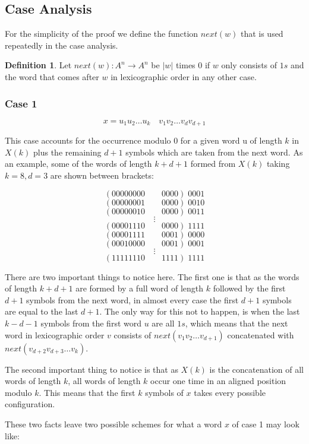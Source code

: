 \documentclass[11pt,a4paper]{tesis}
\theoremstyle{definition}
\newtheorem{definition}{Definition}[section]
\begin{document}
\subsection{Case Analysis}
For the simplicity of the proof we define the function $next(w)$ that is used repeatedly in the case analysis.

\begin{definition}
    Let $next(w):A^n \rightarrow A^n $ be $|w|$ times 0 if $w$ only consists of $1s$ and the word that comes after $w$ in lexicographic order in any other case.
\end{definition}

\subsubsection{Case 1}
$$x = u_1 u_2 \dots u_k \quad v_1 v_2 \dots v_{d} v_{d + 1}$$

This case accounts for the occurrence modulo 0 for a given word u of length $k$ in $X(k)$ plus the remaining $d + 1$ symbols which are taken from the next word.
As an example, some of the words of length $k + d + 1$ formed from $X(k)$ taking $k = 8, d = 3$ are shown between brackets:

$$( 00000000 \qquad 0000 ) \; 0001$$
$$( 00000001 \qquad 0000 ) \; 0010$$
$$( 00000010 \qquad 0000 ) \; 0011$$
$$\vdots$$
$$( 00001110 \qquad 0000 ) \; 1111$$
$$( 00001111 \qquad 0001 ) \; 0000$$
$$( 00010000 \qquad 0001 ) \; 0001$$
$$\vdots$$
$$( 11111110 \qquad 1111 ) \; 1111$$

There are two important things to notice here. The first one is that as the words of length $k + d + 1$ are formed by a full word of length $k$ followed by the first $d + 1$ symbols from the next word, in almost every case the first $d + 1$ symbols are equal to the last $d + 1$.
The only way for this not to happen, is when the last $k - d - 1$ symbols from the first word $u$ are all $1s$, which means that the next word in lexicographic order $v$ consists of $next(v_1 v_2 \dots v_{d + 1})$ concatenated with $next(v_{d + 2} v_{d + 3} \dots v_{k})$.

The second important thing to notice is that as $X(k)$ is the concatenation of all words of length $k$, all words of length $k$ occur one time in an aligned position modulo $k$. This means that the first $k$ symbols of $x$ takes every possible configuration. 

These two facts leave two possible schemes for what a word $x$ of case 1 may look like:
\end{document}
